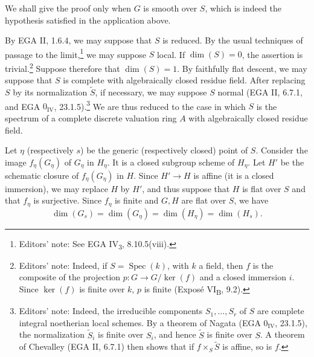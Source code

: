 We shall give the proof only when \(G\) is smooth over \(S\), which is
indeed the hypothesis satisfied in the application above.


By EGA II, 1.6.4, we may suppose that \(S\) is reduced. By the usual
techniques of passage to the limit,\footnote{Editors' note: See
EGA IV\textsubscript{3}, 8.10.5(viii).} we may suppose \(S\) local. If
\(\dim(S)=0\), the assertion is trivial.\footnote{Editors' note:
Indeed, if \(S=\operatorname{Spec}(k)\), with \(k\) a field, then \(f\)
is the composite of the projection \(p\colon G\to G/\ker(f)\) and a
closed immersion \(i\). Since \(\ker(f)\) is finite over \(k\), \(p\)
is finite (Exposé VI\textsubscript{B}, 9.2).}
Suppose therefore that \(\dim(S)=1\). By faithfully flat descent, we may
suppose that \(S\) is complete with algebraically closed residue field.
After replacing \(S\) by its normalization \(\widetilde S\), if
necessary, we may suppose \(S\) normal (EGA II, 6.7.1, and
EGA \(0_{\mathrm{IV}}\), 23.1.5).\footnote{Editors' note:
Indeed, the irreducible components \(S_1,\ldots,S_r\) of \(S\) are
complete integral noetherian local schemes. By a theorem of Nagata
(EGA \(0_{\mathrm{IV}}\), 23.1.5), the normalization
\(\widetilde S_i\) is finite over \(S_i\), and hence
\(\widetilde S\) is finite over \(S\). A theorem of Chevalley
(EGA II, 6.7.1) then shows that if
\(f\times_S\widetilde S\) is affine, so is \(f\).}
We are thus reduced to the case in which \(S\) is the spectrum of a
complete discrete valuation ring \(A\) with algebraically closed
residue field.


Let \(\eta\) (respectively \(s\)) be the generic (respectively closed)
point of \(S\). Consider the image \(f_\eta(G_\eta)\) of \(G_\eta\)
in \(H_\eta\). It is a closed subgroup scheme of \(H_\eta\). Let
\(H'\) be the schematic closure of \(f_\eta(G_\eta)\) in \(H\).
Since \(H'\to H\) is affine (it is a closed immersion), we may replace
\(H\) by \(H'\), and thus suppose that \(H\) is flat over \(S\) and
that \(f_\eta\) is surjective. Since \(f_\eta\) is finite and \(G,H\)
are flat over \(S\), we have
\[
 \dim(G_s)=\dim(G_\eta)=\dim(H_\eta)=\dim(H_s).
\]


